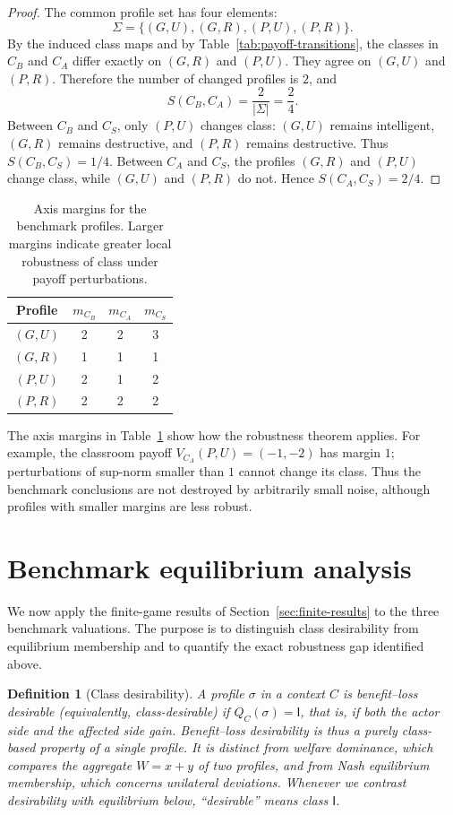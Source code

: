 \documentclass[a4paper,fleqn]{cas-dc}
\newtheorem{definition}{Definition}[section]
\theoremstyle{remark}
\newcommand{\Iclass}{\mathsf{I}}
\newcommand{\Prof}{\Sigma}
\begin{document}
\begin{proof}
The common profile set has four elements:
\[
\Prof=\{(G,U),(G,R),(P,U),(P,R)\}.
\]
By the induced class maps and by Table~\ref{tab:payoff-transitions}, the classes in $C_B$ and $C_A$ differ exactly on $(G,R)$ and $(P,U)$. They agree on $(G,U)$ and $(P,R)$. Therefore the number of changed profiles is $2$, and
\[
S(C_B,C_A)=\frac{2}{|\Prof|}=\frac{2}{4}.
\]
Between $C_B$ and $C_S$, only $(P,U)$ changes class: $(G,U)$ remains intelligent, $(G,R)$ remains destructive, and $(P,R)$ remains destructive. Thus $S(C_B,C_S)=1/4$. Between $C_A$ and $C_S$, the profiles $(G,R)$ and $(P,U)$ change class, while $(G,U)$ and $(P,R)$ do not. Hence $S(C_A,C_S)=2/4$.
\end{proof}

\begin{table}[t]
\centering
\small
\begin{tabular}{cccc}
\toprule
Profile & $m_{C_B}$ & $m_{C_A}$ & $m_{C_S}$\\
\midrule
$(G,U)$ & 2 & 2 & 3\\
$(G,R)$ & 1 & 1 & 1\\
$(P,U)$ & 2 & 1 & 2\\
$(P,R)$ & 2 & 2 & 2\\
\bottomrule
\end{tabular}
\caption{Axis margins for the benchmark profiles. Larger margins indicate greater local robustness of class under payoff perturbations.}
\label{tab:margins}
\end{table}

The axis margins in Table~\ref{tab:margins} show how the robustness theorem applies. For example, the classroom payoff $V_{C_A}(P,U)=(-1,-2)$ has margin $1$; perturbations of sup-norm smaller than $1$ cannot change its class. Thus the benchmark conclusions are not destroyed by arbitrarily small noise, although profiles with smaller margins are less robust.

\section{Benchmark equilibrium analysis}
\label{sec:game-theory}

We now apply the finite-game results of Section~\ref{sec:finite-results} to the three benchmark valuations. The purpose is to distinguish class desirability from equilibrium membership and to quantify the exact robustness gap identified above.

\begin{definition}[Class desirability]
\label{def:class-desirability}
A profile $\sigma$ in a context $C$ is \emph{benefit--loss desirable} (equivalently, \emph{class-desirable}) if $Q_C(\sigma)=\Iclass$, that is, if both the actor side and the affected side gain. Benefit--loss desirability is thus a purely class-based property of a single profile. It is distinct from \emph{welfare dominance}, which compares the aggregate $W=x+y$ of two profiles, and from \emph{Nash equilibrium membership}, which concerns unilateral deviations. Whenever we contrast desirability with equilibrium below, ``desirable'' means class $\Iclass$.
\end{definition}
\end{document}
